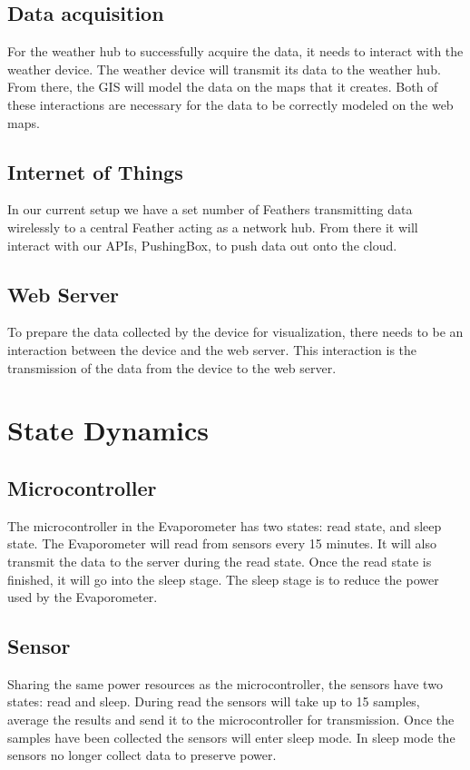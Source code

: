 \documentclass[onecolumn, draftclsnofoot,10pt, compsoc]{IEEEtran}
\begin{document}
\subsection{Data acquisition}
For the weather hub to successfully acquire the data, it needs to interact with the weather device. The weather device will transmit its data to the weather hub. From there, the GIS will model the data on the maps that it creates. Both of these interactions are necessary for the data to be correctly modeled on the web maps.

\subsection{Internet of Things}
In our current setup we have a set number of Feathers transmitting data wirelessly to a central Feather acting as a network hub.  From there it will interact with our APIs, PushingBox, to push data out onto the cloud.

\subsection{Web Server}
To prepare the data collected by the device for visualization, there needs to be an interaction between the device and the web server. This interaction is the transmission of the data from the device to the web server.

\section{State Dynamics}
\subsection{Microcontroller}
The microcontroller in the Evaporometer has two states: read state, and sleep state. The Evaporometer will read from sensors every 15 minutes. It will also transmit the data to the server during the read state. Once the read state is finished, it will go into the sleep stage. The sleep stage is to reduce the power used by the Evaporometer.  

\subsection{Sensor}
Sharing the same power resources as the microcontroller, the sensors have two states: read and sleep.  During read the sensors will take up to 15 samples, average the results and send it to the microcontroller for transmission.  Once the samples have been collected the sensors will enter sleep mode.  In sleep mode the sensors no longer collect data to preserve power.  
\end{document}
